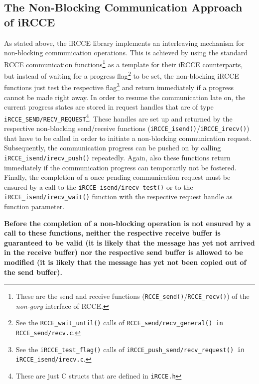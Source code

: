 \documentclass[fontsize=10pt, paper=a4, DIV12, pagesize=auto]{scrartcl}
\begin{document}
\subsection{The Non-Blocking Communication Approach of iRCCE}\label{sec:communication:nonblocking}

As stated above, the iRCCE library implements an interleaving mechanism for non-blocking communication operations.
This is achieved by using the standard RCCE communication functions\footnote{These are the send and receive functions (\texttt{RCCE\_send()}/\texttt{RCCE\_recv()}) of the \emph{non-gory} interface of RCCE.} as a template for their iRCCE counterparts, but instead of waiting for a progress flag\footnote{See the \texttt{RCCE\_wait\_until()} calls of \texttt{RCCE\_send/recv\_general() in RCCE\_send/recv.c}.} to be set, the non-blocking \mbox{iRCCE} functions just test the respective flag\footnote{See the \texttt{iRCCE\_test\_flag()} calls of \texttt{iRCCE\_push\_send/recv\_request() in iRCCE\_isend/irecv.c}.} and return immediately if a progress cannot be made right away.
%
In order to resume the communication late on, the current progress states are stored in request handles that are of type \texttt{iRCCE\_SEND/RECV\_REQUEST}\footnote{These are just C structs that are defined in \texttt{iRCCE.h}}.
These handles are set up and returned by the respective non-blocking send/receive functions (\texttt{iRCCE\_isend()}/\texttt{iRCCE\_irecv()}) that have to be called in order to initiate a non-blocking communication request.
%
Subsequently, the communication progress can be pushed on by calling \texttt{iRCCE\_isend/irecv\_push()} repeatedly.
Again, also these functions return immediately if the communication progress can temporarily not be fostered.
Finally, the completion of a once pending communication request must be ensured by a call to the \texttt{iRCCE\_isend/irecv\_test()} or to the \texttt{iRCCE\_isend/irecv\_wait()} function with the respective request handle as function parameter.

\textbf{Before the completion of a non-blocking operation is not ensured by a call to these functions, neither the respective receive buffer is guaranteed to be valid (it is likely that the message has yet not arrived in the receive buffer) nor the respective send buffer is allowed to be modified (it is likely that the message has yet not been copied out of the send buffer).}
\end{document}
